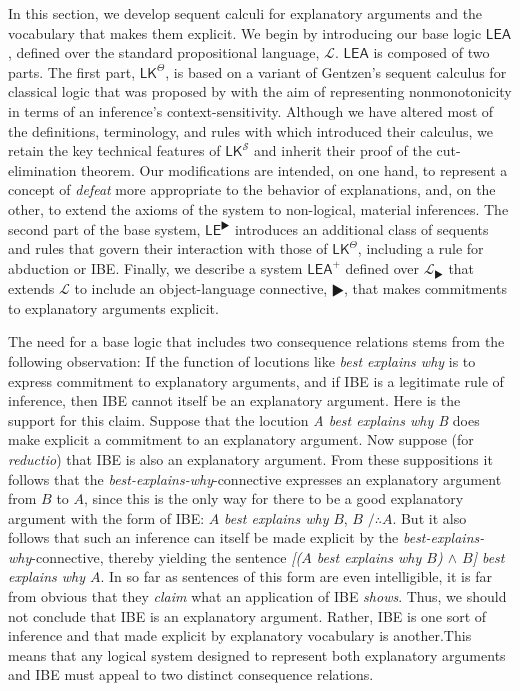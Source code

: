 \documentclass{article}
\newcounter{fncntr}
\newcommand{\fnmark}[1]{\refstepcounter{fncntr}\label{#1}\footnotemark[\getrefnumber{#1}]}
\theoremstyle{definition}
\theoremstyle{definition}
\theoremstyle{definition}
\theoremstyle{definition}
\theoremstyle{remark}
\theoremstyle{definition}
\theoremstyle{definition}
\begin{document}
In this section, we develop sequent calculi for explanatory arguments and the vocabulary that makes them explicit. We begin by introducing our base logic  $ \mathsf{LEA}$, defined over the standard propositional language, $ \mathcal{L} $. $ \mathsf{LEA}$ is composed of two parts. The first part, $ \mathsf{LK^\Theta}$, is based on a variant of Gentzen's sequent calculus for classical logic that was proposed by \textcite{Piazza2015} with the aim of representing nonmonotonicity in terms of an inference's context-sensitivity. Although we have altered most of the definitions, terminology, and rules with which \textcite{Piazza2015} introduced their calculus, we retain the key technical features of $ \mathsf{LK}^{\mathcal{S}}$ and inherit their proof of the cut-elimination theorem. Our modifications are intended, on one hand, to represent a concept of \textit{defeat} more appropriate to the behavior of explanations, and, on the other, to extend the axioms of the system to non-logical, material inferences. The second part of the base system, $ \mathsf{LE^\RHD}$ introduces an additional class of sequents and rules that govern their interaction with those of $ \mathsf{LK^\Theta}$, including a rule for abduction or IBE. Finally, we describe a system $ \mathsf{LEA^+}$ defined over  $ \mathcal{L}_{\RHD} $ that extends $ \mathcal{L} $ to include an object-language connective, $ \RHD $, that makes commitments to explanatory arguments explicit. 

The need for a base logic that includes two consequence relations stems from the following observation:  If the function of locutions like \textit{best explains why} is to express commitment to explanatory arguments, and if IBE is a legitimate rule of inference, then IBE cannot itself be an explanatory argument. Here is the support for this claim. Suppose that the locution \textit{A best explains why B} does make explicit a commitment to an explanatory argument.  Now suppose (for \textit{reductio}) that IBE is also an explanatory argument. From these suppositions it follows that the \textit{best-explains-why}-connective expresses an explanatory argument from $B$ to $A$, since this is the only way for there to be a good explanatory argument with the form of IBE: $A$ \textit{best explains why} $B$, $B$ $/\therefore A$. But it also follows that such an inference can itself be made explicit by the \textit{best-explains-why}-connective, thereby yielding the sentence \textit{[($A$ best explains why $B$) $ \wedge $ $B$] best explains why $A$}. In so far as sentences of this form are even intelligible, it is far from obvious that they \textit{claim} what an application of IBE \textit{shows}. Thus, we should not conclude that IBE is an explanatory argument. Rather, IBE is one sort of inference and that made explicit by explanatory vocabulary is another.\fnmark{revMP} This means that any logical system designed to represent both explanatory arguments and IBE must appeal to two distinct consequence relations.
\end{document}
